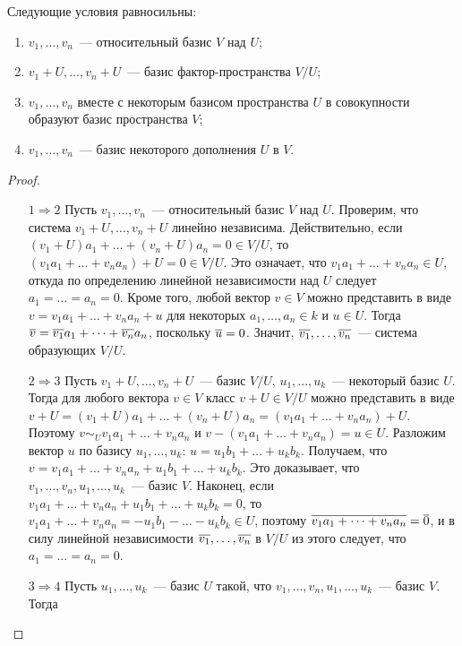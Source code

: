 \begin{theorem}\label{thm_relative_basis}
Следующие условия равносильны:
\begin{enumerate}
\item $v_1,\dots,v_n$~--- относительный базис $V$ над $U$;
\item $v_1+U,\dots,v_n+U$~--- базис фактор-пространства $V/U$;
\item $v_1,\dots,v_n$ вместе с некоторым базисом пространства $U$ в
  совокупности образуют базис пространства $V$;
\item $v_1,\dots,v_n$~--- базис некоторого дополнения $U$ в $V$.
\end{enumerate}
\end{theorem}
\begin{proof}
\begin{itemize}
\item[$1\Rightarrow 2$] Пусть $v_1,\dots,v_n$~--- относительный базис
  $V$ над $U$. Проверим, что система $v_1+U,\dots,v_n+U$ линейно
  независима. Действительно, если
  $(v_1+U)a_1+\dots+(v_n+U)a_n=0\in V/U$,
   то $(v_1a_1+\dots+v_na_n)+U=0\in V/U$.
  Это означает, что $v_1a_1+\dots+v_na_n\in U$, откуда по
  определению линейной независимости над $U$ следует
  $a_1=\dots=a_n=0$.
  Кроме того, любой вектор $v\in V$ можно представить в виде
  $v = v_1a_1+\dots+v_na_n+u$ для некоторых
  $a_1,\dots,a_n\in k$ и $u\in U$. Тогда
  $\overline{v}=\overline{v_1}a_1 + \dots + \overline{v_n}a_n$, поскольку
  $\overline{u}=0$. Значит, $\overline{v_1},\dots,\overline{v_n}$~--- система образующих
  $V/U$.
\item[$2\Rightarrow 3$] Пусть $v_1+U,\dots,v_n+U$~--- базис $V/U$,
  $u_1,\dots,u_k$~--- некоторый базис $U$. Тогда для любого вектора
  $v\in V$ класс $v+U\in V/U$ можно представить в виде
  $v+U=(v_1+U)a_1 + \dots + (v_n+U)a_n = (v_1a_1 +
  \dots + v_na_n) + U$. Поэтому $v\sim_U v_1a_1 + \dots +
  v_na_n$ и $v-(v_1a_1+\dots+v_na_n) = u\in
  U$. Разложим вектор $u$ по базису $u_1,\dots,u_k$:
  $u = u_1b_1 + \dots + u_kb_k$. Получаем, что
  $v = v_1a_1 + \dots + v_na_n + u_1b_1 + \dots +
  u_kb_k$.
  Это доказывает, что $v_1,\dots,v_n,u_1,\dots,u_k$~--- базис $V$.
  Наконец, если $v_1a_1 + \dots + v_na_n + u_1b_1 +
  \dots + u_kb_k = 0$, то $v_1a_1 + \dots + v_na_n =
  -u_1b_1 - \dots - u_kb_k\in U$, поэтому
  $\overline{v_1a_1 + \dots + v_na_n} = \overline{0}$, и в силу
  линейной независимости $\overline{v_1},\dots,\overline{v_n}$ в $V/U$ из этого
  следует, что $a_1 = \dots = a_n = 0$.
\item[$3\Rightarrow 4$] Пусть $u_1,\dots,u_k$~--- базис $U$ такой, что
  $v_1,\dots,v_n,u_1,\dots,u_k$~--- базис $V$. Тогда

\end{itemize}
\end{proof}
